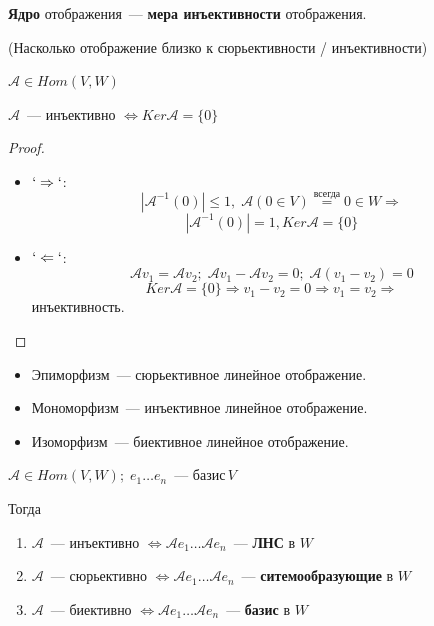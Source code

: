 \textbf{Ядро} отображения~--- \textbf{мера инъективности} отображения.

(Насколько отображение близко к сюрьективности / инъективности)

\begin{Proposition}{}{}

$\mathcal{A} \in Hom (V, W)$

$\mathcal{A}$~--- инъективно $\Leftrightarrow Ker \mathcal{A} = \{ 0 \}$
\end{Proposition}

\begin{proof}
    \begin{itemize}
        \item $`\Rightarrow`$:
        \[
        | \mathcal{A}^{-1}(0) | \le 1, \; \mathcal{A}(0 \in V) \overset{\text{всегда}}{=} 0 \in W \Rightarrow
        \]
        \[
         | \mathcal{A}^{-1}(0) | = 1, Ker \mathcal{A} = \{ 0 \}
        \]

        \item $`\Leftarrow`$:
        \[
        \mathcal{A}v_1 = \mathcal{A}v_2; \; \mathcal{A}v_1 - \mathcal{A}v_2 = 0; \; \mathcal{A}(v_1 - v_2) = 0
        \]
        \[
        Ker \mathcal{A} = \{ 0 \} \Rightarrow v_1 - v_2 = 0 \Rightarrow v_1 = v_2 \Rightarrow
        \]
        инъективность.
    \end{itemize}
\end{proof}

\begin{Definition}{}{}
\begin{itemize}
    \item Эпиморфизм~--- сюрьективное линейное отображение.
    \item Мономорфизм~--- инъективное линейное отображение.
    \item Изоморфизм~--- биективное линейное отображение.
\end{itemize}
\end{Definition}

\begin{Proposition}{}{}
    
    $\mathcal{A} \in Hom (V, W); \; e_1 \ldots e_n \, \text{~--- базис} \, V$

    Тогда

    \begin{enumerate}
        \item $\mathcal{A}$~--- инъективно $\Leftrightarrow \mathcal{A}e_1 \ldots \mathcal{A}e_n$~--- \textbf{ЛНС} в $W$
        \item $\mathcal{A}$~--- сюрьективно $\Leftrightarrow \mathcal{A}e_1 \ldots \mathcal{A}e_n$~--- \textbf{ситемообразующие} в $W$
        \item $\mathcal{A}$~--- биективно $\Leftrightarrow \mathcal{A}e_1 \ldots \mathcal{A}e_n$~--- \textbf{базис} в $W$
    \end{enumerate} 
\end{Proposition}


